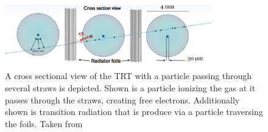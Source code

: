 \begin{figure}
    \centering
    \includegraphics[width=0.8\textwidth]{figures/atlas/atlas_trt_tubes.png}
    \caption{A cross sectional view of the TRT with a particle passing through several straws is depicted. Shown is a particle ionizing the gas at it passes through the straws, creating free electrons. Additionally shown is transition radiation
    that is produce via a particle traversing the foils. Taken from~\cite{atlas_trt}}\label{fig:atlas_trt_straw_hits}
\end{figure}
